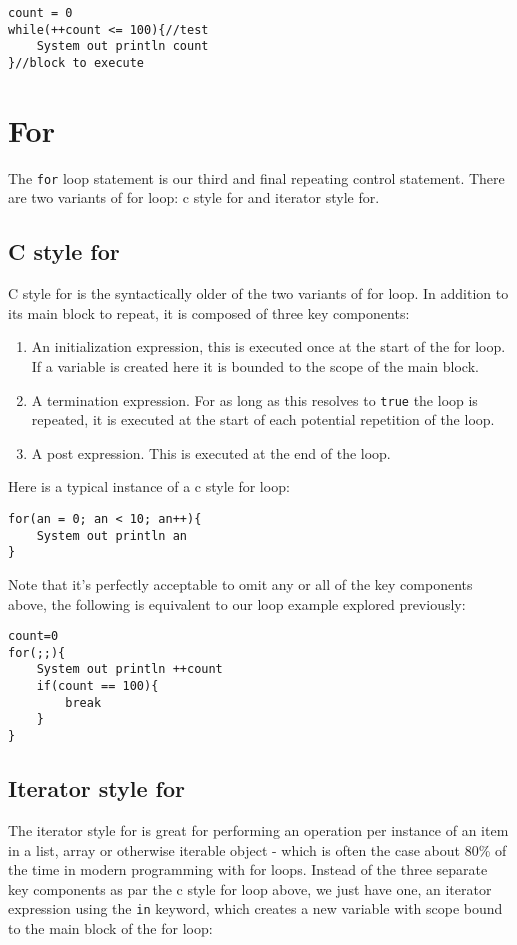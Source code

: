 \documentclass[conc-doc]{subfiles}
\begin{document}
\begin{lstlisting}
count = 0
while(++count <= 100){//test
	System out println count
}//block to execute
\end{lstlisting}

\section{For}
The \lstinline{for} loop statement is our third and final repeating control statement. There are two variants of for loop: c style for and iterator style for.

\subsection{C style for}
\label{subsec:cstylefor}
C style for is the syntactically older of the two variants of for loop. In addition to its main block to repeat, it is composed of three key components:
\begin{enumerate}
	\item An initialization expression, this is executed once at the start of the for loop. If a variable is created here it is bounded to the scope of the main block.
	\item A termination expression. For as long as this resolves to \lstinline{true} the loop is repeated, it is executed at the start of each potential repetition of the loop.
	\item A post expression. This is executed at the end of the loop.
\end{enumerate}

Here is a typical instance of a c style for loop:
\begin{lstlisting}
for(an = 0; an < 10; an++){
	System out println an	
}
\end{lstlisting}

Note that it's perfectly acceptable to omit any or all of the key components above, the following is equivalent to our loop example explored previously:
\begin{lstlisting}
count=0
for(;;){
	System out println ++count
	if(count == 100){
		break
	}
}
\end{lstlisting}

\subsection{Iterator style for}
\label{subsec:IteratorStyleFor}
The iterator style for is great for performing an operation per instance of an item in a list, array or otherwise iterable object - which is often the case about 80\% of the time in modern programming with for loops. Instead of the three separate key components as par the c style for loop above, we just have one, an iterator expression using the \lstinline{in} keyword, which creates a new variable with scope bound to the main block of the for loop:
\end{document}
